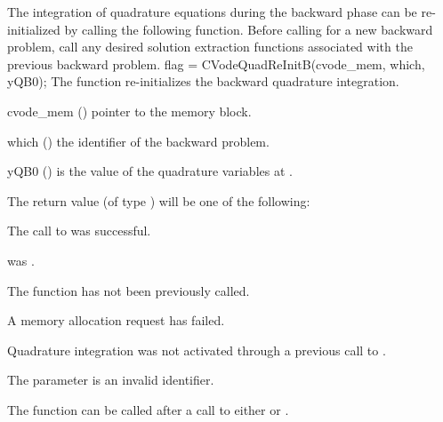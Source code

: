 The integration of quadrature equations during the backward phase can be
re-initialized by calling the following function.
Before calling  for a new backward problem, call any
desired solution extraction functions  associated with the
previous backward problem.
{
  flag = CVodeQuadReInitB(cvode\_mem, which, yQB0);
}
{
  The function  re-initializes the backward quadrature integration.
}
{
  \begin{args}
  \item[cvode\_mem] ()
    pointer to the {\cvodes} memory block.
  \item[which] ()
    the identifier of the backward problem.
  \item[yQB0] ()
    is the value of the quadrature variables at .
  \end{args}
}
{
  The return value  (of type ) will be one of the following:
  \begin{args}
  \item[\Id{CV\_SUCCESS}]
    The call to  was successful.
 \item[\Id{CV\_MEM\_NULL}]
     was .
  \item[\Id{CV\_NO\_ADJ}]
    The function  has not been previously called.
  \item[\Id{CV\_MEM\_FAIL}]
    A memory allocation request has failed.
  \item[\Id{CV\_NO\_QUAD}]
    Quadrature integration was not activated through a  previous
    call to .
  \item[\Id{CV\_ILL\_INPUT}]
    The parameter  is an invalid identifier.
  \end{args}
}
{
  The function  can be called after a call to either
   or .
}

